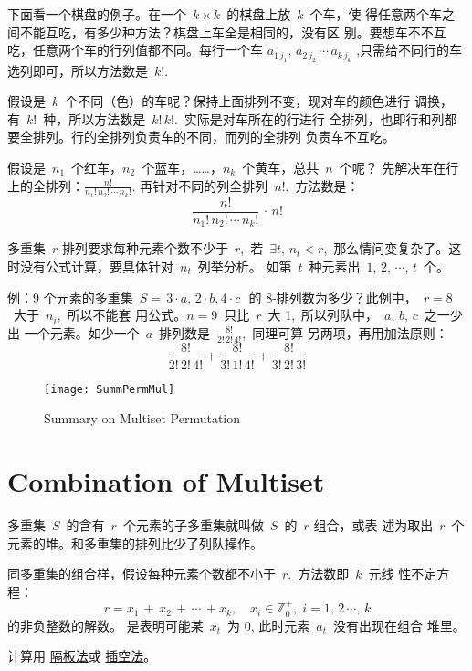 下面看一个棋盘的例子。在一个~$k \times k$~的棋盘上放~$k$~个车，使
得任意两个车之间不能互吃，有多少种方法？棋盘上车全是相同的，没有区
别。要想车不不互吃，任意两个车的行列值都不同。每行一个车
$a_{1\,j_1},\, a_{2\,j_2}\, \cdots\, a_{k\,j_k}$
,只需给不同行的车选列即可，所以方法数是~$k!$.

假设是~$k$~个不同（色）的车呢？保持上面排列不变，现对车的颜色进行
调换，有~$k!$~种，所以方法数是~$k! \, k!$.~实际是对车所在的行进行
全排列，也即行和列都要全排列。行的全排列负责车的不同，而列的全排列
负责车不互吃。

假设是~$n_1$~个红车，$n_2$~个蓝车，……，$n_k$~个黄车，总共~$n$~个呢？
先解决车在行上的全排列：$\frac{n!}{n_1!\, n_2!\, \cdots\, n_k!}$.
再针对不同的列全排列~$n!$.~方法数是：
\[ \frac{n!}{n_1!\, n_2!\, \cdots\, n_k!}\, \cdot\, n! \]

多重集~$r$-排列要求每种元素个数不少于~$r$,~若~$\exists t,\, n_t <
r$,~那么情问变复杂了。这时没有公式计算，要具体针对~$n_t$~列举分析。
如第~$t$~种元素出~$1,\, 2,\, \cdots,\, t$~个。

例：9 个元素的多重集~$S = {\, 3 \cdot a,\, 2 \cdot b, 4 \cdot c
  \,}$~的 8-排列数为多少？此例中，~$r = 8$~大于~$n_i$,~所以不能套
用公式。$n = 9$~只比~$r$~大 1,~所以列队中，~$a,\, b,\, c$~之一少出
一个元素。如少一个~$a$~排列数是~$\frac{8!}{2!\,2!\,4!}$,~同理可算
另两项，再用加法原则：
\[ \frac{8!}{2!\,2!\,4!} + \frac{8!}{3!\,1!\,4!} +
  \frac{8!}{3!\,2!\,3!} \]

\begin{figure}[!htbp]
  \centering
  \texttt{[image: SummPermMul]}
  \caption{Summary on Multiset Permutation}
\end{figure}

\section{Combination of Multiset}
\label{sec:combination-multiset}

多重集~$S$~的含有~$r$~个元素的子多重集就叫做~$S$~的~$r$-组合，或表
述为取出~$r$~个元素的堆。和多重集的排列比少了列队操作。

同多重集的组合样，假设每种元素个数都不小于~$r$.~方法数即~$k$~元线
性不定方程：
\[ r = x_1\, +\, x_2\, +\, \cdots\, + x_k,\quad x_i \in
  \mathbb{Z}_0^+,\; i = 1,\, 2\, \cdots,\, k \] 的非负整数的解数。
是表明可能某~$x_t$~为 0, 此时元素~$a_t$~没有出现在组合
堆里。

计算用
\href{https://zh.wikipedia.org/zh-cn/\%E9\%9A\%94\%E6\%9D\%BF\%E6\%B3\%95}{
  隔板法}或
\href{https://zh.wikipedia.org/wiki/\%E6\%8F\%92\%E7\%A9\%BA\%E6\%B3\%95}{
  插空法}。

